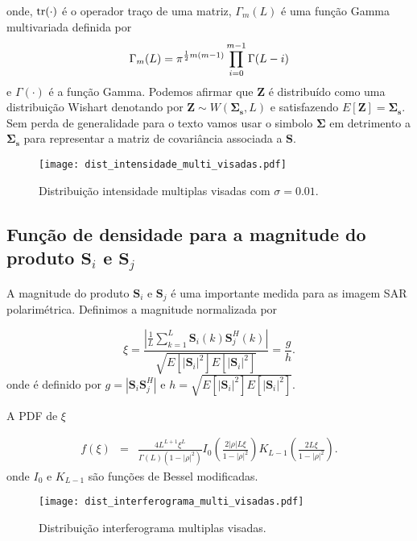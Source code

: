 onde, $\operatorname{tr}(\cdot)$ é o operador traço de uma matriz, $\Gamma_m(L)$ é uma função Gamma multivariada definida por
\begin{equation}\label{cap_acf_10}
	\Gamma_m(L)=\pi^{\frac{1}{2}m(m-1)} \prod_{i=0}^{m-1}\Gamma(L-i) \\
\end{equation}
e $\Gamma(\cdot)$ é a função Gamma. Podemos afirmar que $\mathbf{Z}$ é distribuído como uma distribuição Wishart denotando por $\mathbf{Z}\sim W(\mathbf{\Sigma_{s}}, L)$ e satisfazendo $E[\mathbf{Z}]=\mathbf{\Sigma_{s}}$. Sem perda de generalidade para o texto vamos usar o simbolo $\mathbf{\Sigma}$ em detrimento a $\mathbf{\Sigma_{s}}$ para representar a matriz de covariância associada a $\mathbf{S}$.

\begin{figure}[hbt]
\centering
\texttt{[image: dist\_intensidade\_multi\_visadas.pdf]}
	\caption{Distribuição intensidade multiplas visadas com $\sigma=0.01$.}
\label{fig2}
\end{figure}


\subsection{Função de densidade para a magnitude do produto $\mathbf{S}_i$ e $\mathbf{S}_j$}
A magnitude do produto $\mathbf{S}_i$ e $\mathbf{S}_j$ é uma importante medida para as imagem SAR polarimétrica. Definimos a magnitude normalizada por 

\begin{equation}
	\xi = \frac{\left|\frac{1}{L} \sum_{k=1}^L\mathbf{S}_i(k)\mathbf{S}_j^H(k) \right|}{\sqrt{E[|\mathbf{S}_i|^2]E[|\mathbf{S}_i|^2]}}=\frac{g}{h}.
\end{equation}
onde é definido por $g=|\mathbf{S}_i\mathbf{S}_j^H|$ e $h=\sqrt{E[|\mathbf{S}_i|^2]E[|\mathbf{S}_i|^2]}$.

A PDF de $\xi$

\begin{equation}
\begin{array}{ccc}
	f(\xi)&=&\frac{4L^{L+1}\xi^L}{\Gamma(L)(1-|\rho|^2)}I_0\left(\frac{2|\rho|L\xi}{1-|\rho|^2}\right)K_{L-1}\left(\frac{2L\xi}{1-|\rho|^2}\right).
		\end{array}
\end{equation}
onde $I_0$ e $K_{L-1}$ são funções de Bessel modificadas.

\begin{figure}[hbt]
\centering
\texttt{[image: dist\_interferograma\_multi\_visadas.pdf]}
	\caption{Distribuição interferograma multiplas visadas.}
\label{fig2}
\end{figure}


